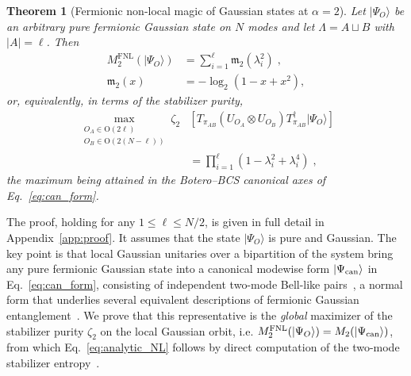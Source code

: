 \documentclass[prx,twocolumn,superscriptaddress,aps,10pt, frontmatterverbose, reprint,footinbib,longbibliography=true]{revtex4-2}
\newtheorem{theorem}{Theorem}
\newcommand{\RENYI}{\alpha}
\providecommand{\DIFaddend}{\protect\color{black}} %
\begin{document}
\begin{theorem}[Fermionic non-local magic of Gaussian states at $\RENYI=2$]
\label{thm:global}
Let $|\Psi_O\rangle$ be an arbitrary pure fermionic Gaussian state on $N$ modes and let $\Lambda=A\sqcup B$ with $|A|=\ell$. Then
\begin{equation}
\begin{split}
    M_{2}^{\mathrm{FNL}}(|\Psi_O\rangle)&=\sum_{i=1}^{\ell}\mathfrak{m}_2(\lambda_i^2)\;,\\
    \mathfrak{m}_2(x)&=-\log_2\!\left(1-x+x^2\right),
\end{split}
    \label{eq:analytic_NL}
\end{equation}
or, equivalently, in terms of the stabilizer purity,
\begin{equation}
\begin{split}
\max_{\substack{O_A\in \mathrm{O}(2\ell)\\ O_B\in \mathrm{O}(2(N-\ell))}}\!\!\!\!\zeta_2&\left[T_{\pi_{AB}}(U_{O_A}\otimes U_{O_B})T_{\pi_{AB}}^\dagger|\Psi_O\rangle\right]\\ &=\prod_{i=1}^{\ell}\left(1-\lambda_i^2+\lambda_i^4\right)\;,
\end{split}
\label{eq:thm_zeta}
\end{equation}
the maximum being attained in the Botero--BCS canonical axes of Eq.~\eqref{eq:can_form}.
\end{theorem}

The proof, holding for any $1\le\ell\le N/2$\DIFaddend , is given in full detail in Appendix~\ref{app:proof}. It assumes that the state $|\Psi_O\rangle$ is pure and Gaussian.
The key point is that local Gaussian unitaries over a bipartition of the system bring any pure fermionic Gaussian state into a canonical modewise form $\ket{\Psi_{\rm can}}$ in Eq.~\eqref{eq:can_form}, consisting of independent two-mode Bell-like pairs~\cite{BoteroReznik2004}, a normal form that underlies several equivalent descriptions of fermionic Gaussian entanglement~\cite{SpeeSchwaigerGiedkeKraus2018,MorralYepesLangerGammonSmithKrausPollmann2025,langer2026matchgatecircuitrepresentationfermionic}.
We prove that this representative is the \emph{global} maximizer of the stabilizer purity $\zeta_2$ on the local Gaussian orbit, i.e.
$M_{2}^{\mathrm{FNL}}(|\Psi_O\rangle) = M_{2}(|\Psi_{\rm can}\rangle)$,
from which Eq.~\eqref{eq:analytic_NL} follows by direct computation of the two-mode stabilizer entropy~\cite{Cao_2025,qian2025quantumnonlocalnonstabilizerness}.
\end{document}
